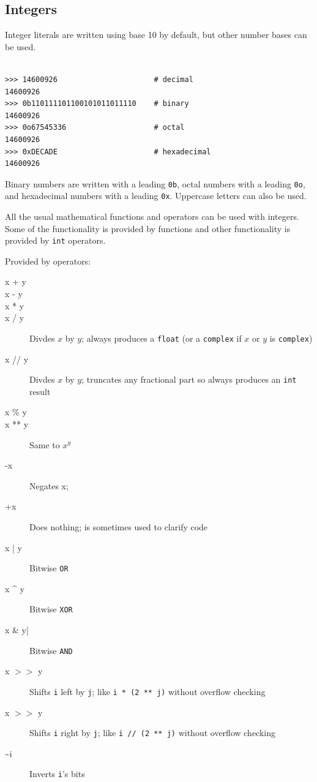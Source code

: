 \subsection{Integers}

Integer literals are written using base 10 by default, but other number bases can be used.

\begin{lstlisting}

>>> 14600926                      # decimal
14600926
>>> 0b110111101100101011011110    # binary
14600926                          
>>> 0o67545336                    # octal
14600926
>>> 0xDECADE                      # hexadecimal
14600926
\end{lstlisting}



Binary numbers are written with a leading \verb|0b|,
octal numbers with a leading \verb|0o|, and
hexadecimal numbers with a leading \verb|0x|.
Uppercase letters can also be used.



All the usual mathematical functions and operators can be used with integers.
Some of the functionality is provided by functions and other functionality is provided by \verb|int| operators.


Provided by operators:
\begin{description}
\item[x + y] 
\item[x - y]
\item[x * y] 
\item[x / y] Divdes $x$ by $y$; always produces a \verb|float| (or a \verb|complex| if $x$ or $y$ is \verb|complex|)
\item[x // y] Divdes $x$ by $y$; truncates any fractional part so always produces an \verb|int| result
\item[x \% y]   
\item[x ** y] Same to $x^y$
\item[-x] Negates x;
\item[+x] Does nothing; is sometimes used to clarify code
\item[x | y] Bitwise \verb|OR| 
\item[x \^{} y] Bitwise \verb|XOR|
\item[x \&{} y|] Bitwise \verb|AND|
\item[x $>>$ y] Shifts \verb|i| left by \verb|j|; like \verb|i * (2 ** j)| without overflow checking
\item[x $>>$ y] Shifts \verb|i| right by \verb|j|; like \verb|i // (2 ** j)| without overflow checking
\item[\~{}i]  Inverts \verb|i|'s bits
\end{description}

